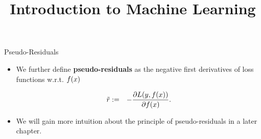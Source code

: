 




\newcommand{\titlefigure}{figure_man/optimization_steps.jpeg}
\newcommand{\learninggoals}{
\item Learn what pseudo-residuals are 
\item Understand the relationship between pseudo-residuals and gradient descent 
}

\title{Introduction to Machine Learning}
\date{}






\begin{vbframe}{Pseudo-Residuals}

\begin{itemize}
\item We further define \textbf{pseudo-residuals} as the negative first derivatives of loss functions w.r.t. $f(x)$

  \begin{eqnarray*}
    \tilde r &:=& - \frac{\partial \Lxy}{\partial \fx}.  %
  \end{eqnarray*}
\item We will gain more intuition about the principle of pseudo-residuals in a later chapter. 
\end{itemize}

\end{vbframe}



